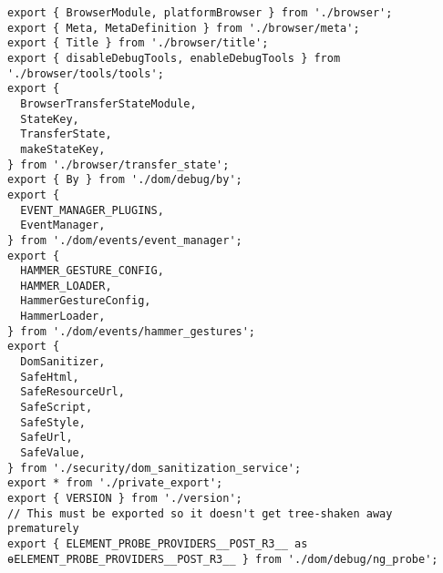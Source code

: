 \begin{verbatim}
export { BrowserModule, platformBrowser } from './browser';
export { Meta, MetaDefinition } from './browser/meta';
export { Title } from './browser/title';
export { disableDebugTools, enableDebugTools } from './browser/tools/tools';
export {
  BrowserTransferStateModule,
  StateKey,
  TransferState,
  makeStateKey,
} from './browser/transfer_state';
export { By } from './dom/debug/by';
export {
  EVENT_MANAGER_PLUGINS,
  EventManager,
} from './dom/events/event_manager';
export {
  HAMMER_GESTURE_CONFIG,
  HAMMER_LOADER,
  HammerGestureConfig,
  HammerLoader,
} from './dom/events/hammer_gestures';
export {
  DomSanitizer,
  SafeHtml,
  SafeResourceUrl,
  SafeScript,
  SafeStyle,
  SafeUrl,
  SafeValue,
} from './security/dom_sanitization_service';
export * from './private_export';
export { VERSION } from './version';
// This must be exported so it doesn't get tree-shaken away prematurely
export { ELEMENT_PROBE_PROVIDERS__POST_R3__ as ɵELEMENT_PROBE_PROVIDERS__POST_R3__ } from './dom/debug/ng_probe';
\end{verbatim}
